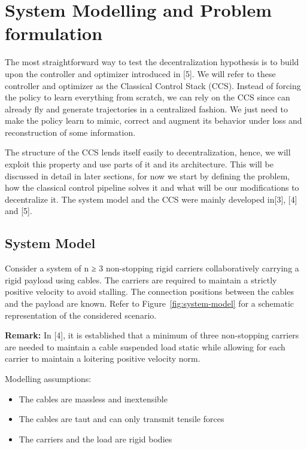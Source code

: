 \chapter{System Modelling and Problem formulation}

The most straightforward way to test the decentralization hypothesis is
to build upon the controller and optimizer introduced in [5]. We will refer
to these controller and optimizer as the Classical Control Stack (CCS).
Instead of forcing the policy to learn everything
from scratch, we can rely on the CCS since can already fly and generate trajectories 
in a centralized fashion. We just need to make the policy learn to mimic,
correct and augment its behavior under loss and reconstruction of some
information. 

The structure of the CCS lends itself
easily to decentralization, hence, we will exploit this property and use
parts of it and its architecture. This will be discussed in detail in
later sections, for now we start by defining the problem, how the
classical control pipeline solves it and what will be our modifications
to decentralize it. The system model and the CCS were mainly developed in[3],
[4] and [5].

\section{System Model}

Consider a system of n ≥ 3 non-stopping rigid carriers collaboratively
carrying a rigid payload using cables. The carriers are required to
maintain a strictly positive velocity to avoid stalling. The connection
positions between the cables and the payload are known. Refer to
Figure~\ref{fig:system-model} for a schematic representation of the
considered scenario.

\textbf{Remark:} In [4], it is established that a minimum of three non-stopping
carriers are needed to maintain a cable suspended load static while
allowing for each carrier to maintain a loitering positive velocity norm.

Modelling assumptions:

\begin{itemize}
  \item The cables are massless and inextensible
  \item The cables are taut and can only transmit tensile forces
  \item The carriers and the load are rigid bodies
\end{itemize}

